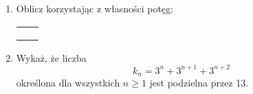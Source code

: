 \documentclass[12pt,a4paper]{article}
\begin{document}
\begin{enumerate}[1.]
	\item Oblicz korzystając z własności potęg:
	
	\begin{enumerate}[a)] \begin{tabular}{p{7cm} p{7cm}}
			\item $\frac{3^3\cdot3^6+(3^3)^3}{3^8}=$& \vspace{0.4cm}\item $\frac{8^4:(2^7)^{-2}-4^12}{2^24}=$ \\
			\item $\frac{(2^2)^3-2^8:4^2}{8}=$& \item$\frac{2^{102}+2^{103}+2^{104}}{3\cdot4^{25}}=$ \\
			\item $(a^7:(a^3)^{-2})^{-1}\cdot(a^{-7}\cdot a^5)^2=$& \item$(3^7\cdot\frac{1}{9}^3)^{-3}:(\frac{1}{3}^7:\frac{1}{27})^{4}=$ \\
	\end{tabular} \end{enumerate}
	
	
	\item Wykaż, że liczba 
	$$k_n = 3^n+3^{n+1}+3^{n+2}$$
		określona dla wszystkich $n\geq1$ jest podzielna przez 13.
		

\end{enumerate}
\end{document}
